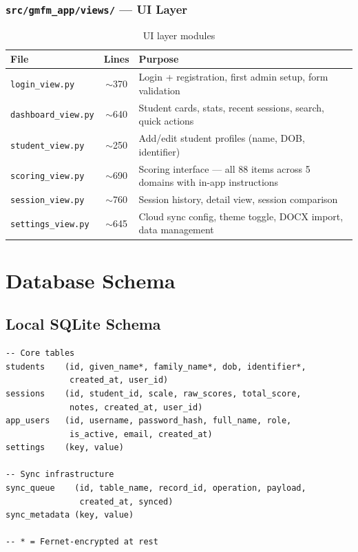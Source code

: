 \documentclass[12pt,a4paper]{article}
\begin{document}
\subsubsection{\texttt{src/gmfm\_app/views/} --- UI Layer}

\begin{table}[H]
\centering
\renewcommand{\arraystretch}{1.3}
\begin{tabularx}{\textwidth}{l c X}
\toprule
\textbf{File} & \textbf{Lines} & \textbf{Purpose} \\
\midrule
\texttt{login\_view.py}     & $\sim$370 & Login + registration, first admin setup, form validation \\
\texttt{dashboard\_view.py} & $\sim$640 & Student cards, stats, recent sessions, search, quick actions \\
\texttt{student\_view.py}   & $\sim$250 & Add/edit student profiles (name, DOB, identifier) \\
\texttt{scoring\_view.py}   & $\sim$690 & Scoring interface --- all 88 items across 5 domains with in-app instructions \\
\texttt{session\_view.py}   & $\sim$760 & Session history, detail view, session comparison \\
\texttt{settings\_view.py}  & $\sim$645 & Cloud sync config, theme toggle, DOCX import, data management \\
\bottomrule
\end{tabularx}
\caption{UI layer modules}
\end{table}

\section{Database Schema}

\subsection{Local SQLite Schema}

\begin{lstlisting}[style=sql, caption={Local SQLite schema}]
-- Core tables
students    (id, given_name*, family_name*, dob, identifier*,
             created_at, user_id)
sessions    (id, student_id, scale, raw_scores, total_score,
             notes, created_at, user_id)
app_users   (id, username, password_hash, full_name, role,
             is_active, email, created_at)
settings    (key, value)

-- Sync infrastructure
sync_queue    (id, table_name, record_id, operation, payload,
               created_at, synced)
sync_metadata (key, value)

-- * = Fernet-encrypted at rest
\end{lstlisting}
\end{document}
